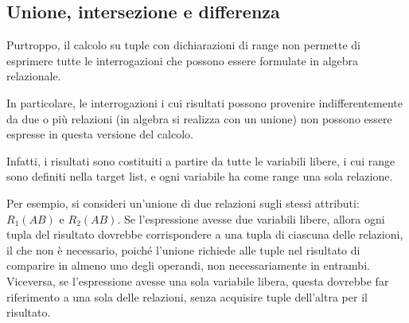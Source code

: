 \documentclass[a4paper]{article}
\begin{document}
	\subsection{Unione, intersezione e differenza}
	
	Purtroppo, il calcolo su tuple con dichiarazioni di range non permette di esprimere tutte le interrogazioni che possono essere formulate in algebra relazionale.\newline
	
	\noindent
	In particolare, le interrogazioni i cui risultati possono provenire indifferentemente da due o più relazioni (in algebra si realizza con un unione) non possono essere espresse in questa versione del calcolo.\newline
	
	\noindent
	Infatti, i risultati sono costituiti a partire da tutte le variabili libere, i cui range sono definiti nella target list, e ogni variabile ha come range una sola relazione.\newline
	
	\noindent
	Per esempio, si consideri un'unione di due relazioni sugli stessi attributi: $R_{1}\left(AB\right)$ e $R_{2}\left(AB\right)$. Se l'espressione avesse due variabili libere, allora ogni tupla del risultato dovrebbe corrispondere a una tupla di ciascuna delle relazioni, il che non è necessario, poiché l'unione richiede alle tuple nel risultato di comparire in almeno uno degli operandi, non necessariamente in entrambi. Viceversa, se l'espressione avesse una sola variabile libera, questa dovrebbe far riferimento a una sola delle relazioni, senza acquisire tuple dell'altra per il risultato.\newline
	
\end{document}
